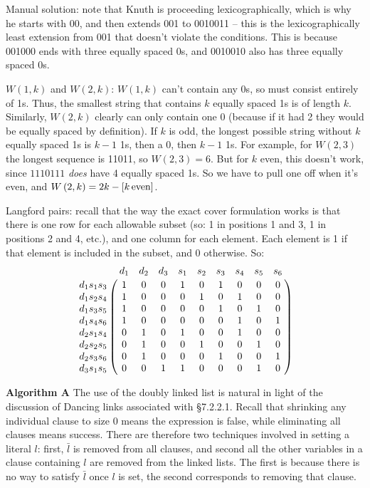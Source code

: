
 Manual solution: note that Knuth is proceeding lexicographically,
which is why he starts with 00, and then extends 001 to 0010011 -- this
is the lexicographically least extension from 001 that doesn't violate
the conditions.  This is because 001000 ends with three equally spaced 0s,
and 0010010 also has three equally spaced 0s.

 $W\left(1, k\right)$ and $W\left(2, k\right)$: $W\left(1,k\right)$
can't contain any 0s, so must consist entirely of 1s.  Thus, the smallest
string that contains $k$ equally spaced 1s is of length $k$.  
Similarly, $W\left(2, k\right)$ clearly can only contain one 0 (because
if it had 2 they would be equally spaced by definition).  If $k$
is odd, the longest possible string without $k$ equally spaced 1s 
is $k-1$ 1s, then a 0, then $k-1$ 1s.  For example, for
$W\left(2, 3\right)$ the longest sequence is 11011, so
$W\left(2, 3\right) = 6$.  But for $k$ even, this doesn't
work, since $1110111$ {\it does} have 4 equally spaced 1s.
So we have to pull one off when it's even, and
$W\left(2, k\right) = 2 k - \left[ k\, {\rm even} \right]$.


 Langford pairs: recall that the way the exact cover
formulation works is that there is one row for each allowable subset
(so: 1 in positions 1 and 3, 1 in positions 2 and 4, etc.), and one
column for each element.  Each element is 1 if that element
is included in the subset, and 0 otherwise.  So:
$$
 \bordermatrix{
  ~                   & d_1 & d_2 & d_3 & s_1 & s_2 & s_3 & s_4 & s_5 & s_6 \cr
   d_1 s_1 s_3 & 1    & 0     & 0     & 1     & 0     & 1     & 0     & 0     & 0    \cr
   d_1 s_2 s_4 & 1    & 0     & 0     & 0     & 1     & 0     & 1     & 0     & 0    \cr
   d_1 s_3 s_5 & 1    & 0     & 0     & 0     & 0     & 1     & 0     & 1     & 0    \cr
   d_1 s_4 s_6 & 1    & 0     & 0     & 0     & 0     & 0     & 1     & 0     & 1    \cr
   d_2 s_1 s_4 & 0    & 1     & 0     & 1     & 0     & 0     & 1     & 0     & 0    \cr
   d_2 s_2 s_5 & 0    & 1     & 0     & 0     & 1     & 0     & 0     & 1     & 0    \cr
   d_2 s_3 s_6 & 0    & 1     & 0     & 0     & 0     & 1     & 0     & 0     & 1    \cr
   d_3 s_1 s_5 & 0    & 0     & 1     & 1     & 0     & 0     & 0     & 1     & 0    \cr
 } 
$$


 {\bf Algorithm A}\hfil\break
The use of the doubly linked list is
natural in light of the discussion of Dancing links associated with 
\S 7.2.2.1.  Recall that shrinking any individual
clause to size 0 means the expression is false, while eliminating
all clauses means success.  There are therefore two techniques involved
in setting a literal $l$: first, $\bar l$ is removed from all clauses, and
second all the other variables in a clause containing $l$ are removed
from the linked lists.  The first is because there is no way to satisfy
$\bar l$ once $l$ is set, the second corresponds to removing that clause.

